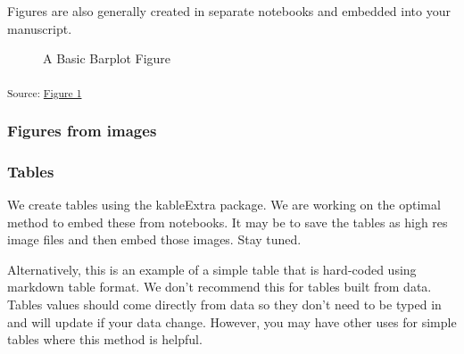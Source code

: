 \documentclass[
  letterpaper,
  DIV=11,
  numbers=noendperiod]{scrartcl}
\begin{document}
Figures are also generally created in separate notebooks and embedded
into your manuscript.

\begin{figure}[H]


\caption{\label{fig-1}A Basic Barplot Figure}

\end{figure}%

\textsubscript{Source:
\href{https://jjcurtin.github.io/study_test/notebooks/fig1-preview.html\#cell-fig-1}{Figure
1}}

\subsubsection{Figures from images}\label{figures-from-images}

\subsubsection{Tables}\label{tables}

We create tables using the kableExtra package. We are working on the
optimal method to embed these from notebooks. It may be to save the
tables as high res image files and then embed those images. Stay tuned.

Alternatively, this is an example of a simple table that is hard-coded
using markdown table format. We don't recommend this for tables built
from data. Tables values should come directly from data so they don't
need to be typed in and will update if your data change. However, you
may have other uses for simple tables where this method is helpful.
\end{document}
